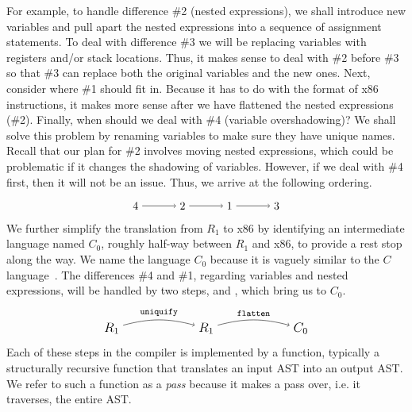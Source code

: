 \documentclass[11pt]{book}
\begin{document}
For example, to handle difference \#2 (nested expressions), we shall
introduce new variables and pull apart the nested expressions into a
sequence of assignment statements.  To deal with difference \#3 we
will be replacing variables with registers and/or stack
locations. Thus, it makes sense to deal with \#2 before \#3 so that
\#3 can replace both the original variables and the new ones. Next,
consider where \#1 should fit in. Because it has to do with the format
of x86 instructions, it makes more sense after we have flattened the
nested expressions (\#2). Finally, when should we deal with \#4
(variable overshadowing)?  We shall solve this problem by renaming
variables to make sure they have unique names. Recall that our plan
for \#2 involves moving nested expressions, which could be problematic
if it changes the shadowing of variables. However, if we deal with \#4
first, then it will not be an issue.  Thus, we arrive at the following
ordering.
\[
\begin{tikzpicture}[baseline=(current  bounding  box.center)]
\foreach \i/\p in {4/1,2/2,1/3,3/4}
{
  \node (\i) at (\p*1.5,0) {$\i$};
}
\foreach \x/\y in {4/2,2/1,1/3}
{
  \draw[->] (\x) to (\y);
}
\end{tikzpicture}
\]
We further simplify the translation from $R_1$ to x86 by identifying
an intermediate language named $C_0$, roughly half-way between $R_1$
and x86, to provide a rest stop along the way. We name the language
$C_0$ because it is vaguely similar to the $C$
language~\citep{Kernighan:1988nx}. The differences \#4 and \#1,
regarding variables and nested expressions, will be handled by two
steps,  and , which bring us to
$C_0$.
\[
\begin{tikzpicture}[baseline=(current  bounding  box.center)]
\foreach \i/\p in {R_1/1,R_1/2,C_0/3}
{
  \node (\p) at (\p*3,0) {\large $\i$};
}
\foreach \x/\y/\lbl in {1/2/uniquify,2/3/flatten}
{
 \path[->,bend left=15] (\x) edge [above] node {\ttfamily\footnotesize \lbl} (\y);
}
\end{tikzpicture}
\]
Each of these steps in the compiler is implemented by a function,
typically a structurally recursive function that translates an input
AST into an output AST. We refer to such a function as a \emph{pass}
because it makes a pass over, i.e. it traverses, the entire AST.
\end{document}
